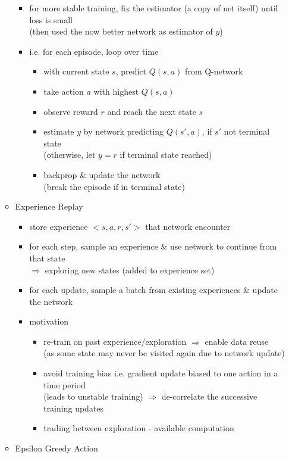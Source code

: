 \begin{itemize}
\begin{itemize}
\begin{itemize}
		\item for more stable training, fix the estimator (a copy of net itself) until loss is small \\
		(then used the now better network as estimator of $y$)
		\item i.e. for each episode, loop over time
			\begin{itemize}
			\item with current state $s$, predict $Q(s, a)$ from Q-network
			\item take action $a$ with highest $Q(s,a)$
			\item observe reward $r$ and reach the next state $s$
			\item estimate $y$ by network predicting $Q(s', a)$, if $s'$ not terminal state \\
			(otherwise, let $y=r$ if terminal state reached)
			\item backprop \& update the network \\
			(break the episode if in terminal state)
			\end{itemize}
		\end{itemize}
	\item Experience Replay
		\begin{itemize}
		\item store experience $<s, a, r, s'>$ that network encounter
		\item for each step, sample an experience \& use network to continue from that state \\
		$\Rightarrow$ exploring new states (added to experience set)
		\item for each update, sample a batch from existing experiences \& update the network
		\item motivation
			\begin{itemize}
			\item re-train on past experience/exploration $\Rightarrow$ enable data reuse \\
			(as some state may never be visited again due to network update)
			\item avoid training bias i.e. gradient update biased to one action in a time period \\
			(leads to unstable training)
			$\Rightarrow$ de-correlate the successive training updates
			\item trading between exploration - available computation
			\end{itemize}
		\end{itemize}
	\item Epsilon Greedy Action

\end{itemize}
\end{itemize}

